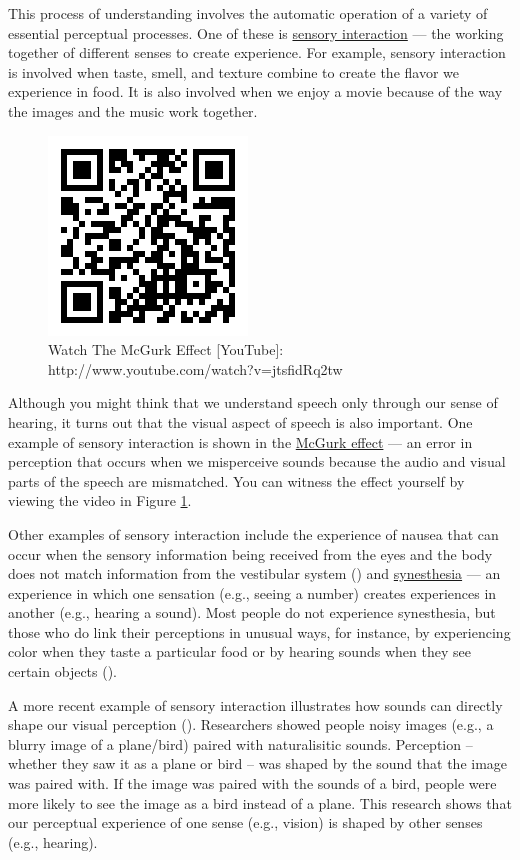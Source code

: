 \documentclass[
]{krantz}
\begin{document}
This process of understanding involves the automatic operation of a variety of essential perceptual processes. One of these is \hyperref[sensory-interaction]{sensory interaction} --- the working together of different senses to create experience. For example, sensory interaction is involved when taste, smell, and texture combine to create the flavor we experience in food. It is also involved when we enjoy a movie because of the way the images and the music work together.

\begin{figure}

{\centering \includegraphics[width=0.25\linewidth]{images/ch2/qr} 

}

\caption{Watch The McGurk Effect [YouTube]: http://www.youtube.com/watch?v=jtsfidRq2tw }\label{fig:mcgurk}
\end{figure}

Although you might think that we understand speech only through our sense of hearing, it turns out that the visual aspect of speech is also important. One example of sensory interaction is shown in the \hyperref[mcgurk-effect]{McGurk effect} --- an error in perception that occurs when we misperceive sounds because the audio and visual parts of the speech are mismatched. You can witness the effect yourself by viewing the video in Figure \ref{fig:mcgurk}.

Other examples of sensory interaction include the experience of nausea that can occur when the sensory information being received from the eyes and the body does not match information from the vestibular system () and \hyperref[synesthesia]{synesthesia} --- an experience in which one sensation (e.g., seeing a number) creates experiences in another (e.g., hearing a sound). Most people do not experience synesthesia, but those who do link their perceptions in unusual ways, for instance, by experiencing color when they taste a particular food or by hearing sounds when they see certain objects ().

A more recent example of sensory interaction illustrates how sounds can directly shape our visual perception (). Researchers showed people noisy images (e.g., a blurry image of a plane/bird) paired with naturalisitic sounds. Perception -- whether they saw it as a plane or bird -- was shaped by the sound that the image was paired with. If the image was paired with the sounds of a bird, people were more likely to see the image as a bird instead of a plane. This research shows that our perceptual experience of one sense (e.g., vision) is shaped by other senses (e.g., hearing).
\end{document}
